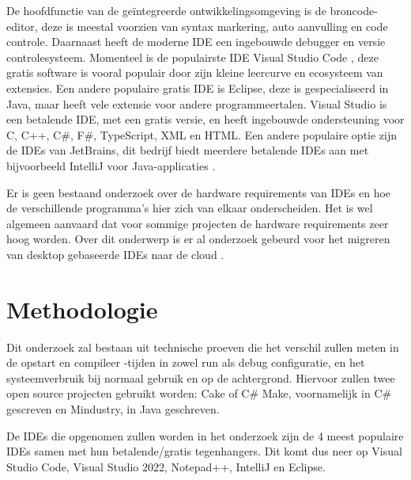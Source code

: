 De hoofdfunctie van de geïntegreerde ontwikkelingsomgeving is de broncode-editor, deze is meestal voorzien van syntax markering, auto aanvulling en code controle. Daarnaast heeft de moderne IDE een ingebouwde debugger en versie controlesysteem. Momenteel is de populairste IDE Visual Studio Code \autocite{StackOverflow2021}, deze gratis software is vooral populair door zijn kleine leercurve en ecosysteem van extensies. Een andere populaire gratis IDE is Eclipse, deze is gespecialiseerd in Java, maar heeft vele extensie voor andere programmeertalen. Visual Studio is een betalende IDE, met een gratis versie, en heeft ingebouwde ondersteuning voor C, C++, C\#, F\#, TypeScript, XML en HTML. Een andere populaire optie zijn de IDEs van JetBrains, dit bedrijf biedt meerdere betalende IDEs aan met bijvoorbeeld IntelliJ voor Java-applicaties .

Er is geen bestaand onderzoek over de hardware requirements van IDEs en hoe de verschillende programma's hier zich van elkaar onderscheiden. Het is wel algemeen aanvaard dat voor sommige projecten de hardware requirements zeer hoog worden. Over dit onderwerp is er al onderzoek gebeurd voor het migreren van desktop gebaseerde IDEs naar de cloud \autocite{Devadiga2021}.


\section{Methodologie}
\label{sec:methodologie}

Dit onderzoek zal bestaan uit technische proeven die het verschil zullen  meten in de opstart en compileer -tijden in zowel run als debug configuratie, en het systeemverbruik bij normaal gebruik en op de achtergrond. Hiervoor zullen twee open source projecten gebruikt worden: Cake of C\# Make, voornamelijk in C\# gescreven en Mindustry, in Java geschreven.

De IDEs die opgenomen zullen worden in het onderzoek zijn de 4 meest populaire IDEs \autocite{StackOverflow2021} samen met hun betalende/gratis tegenhangers. Dit komt dus neer op Visual Studio Code, Visual Studio 2022, Notepad++, IntelliJ en Eclipse. 

